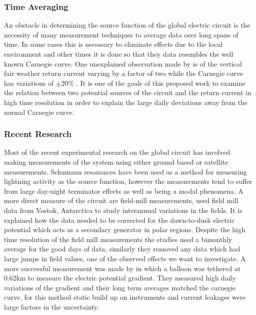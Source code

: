 \subsubsection*{Time Averaging}

An obstacle in determining the source function of the global electric circuit is the necessity of many measurement techniques to average data over long spans of time.
In some cases this is necessary to eliminate effects due to the local environment and other times it is done so that they data resembles the well known Carnegie curve.
One unexplained observation made by \citet{Holzworth1984} is of the vertical fair weather return current varying by a factor of two while the Carnegie curve has variations of $\pm20$\% \citep{Whipple1929}.
It is one of the goals of this proposed work to examine the relation between two potential sources of the circuit and the return current in high time resolution in order to explain the large daily deviations away from the normal Carnegie curve.

\subsubsection*{Recent Research}

Most of the recent experimental research on the global circuit has involved making measurements of the system using either ground based or satellite measurements.
Schumann resonances have been used as a method for measuring lightning activity as the source function, however the measurements tend to suffer from large day-night terminator effects \citep{Price2007} as well as being a modal phenomena.
A more direct measure of the circuit are field-mill measurements, \citet{Burns2005} used field mill data from Vostok, Antarctica to study interannual variations in the fields.
It is explained how the data needed to be corrected for the dawn-to-dusk electric potential which acts as a secondary generator in polar regions.
Despite the high time resolution of the field mill measurements the studies used a bimonthly average for the good days of data, similarly they removed any data which had large jumps in field values, one of the observed effects we want to investigate.
A more successful measurement was made by \citet{Holzworth1984} in which a balloon was tethered at 0.62km to measure the electric potential gradient.
They measured high daily variations of the gradient and their long term averages matched the carnegie curve, for this method static build up on instruments and current leakages were large factors in the uncertainty.

